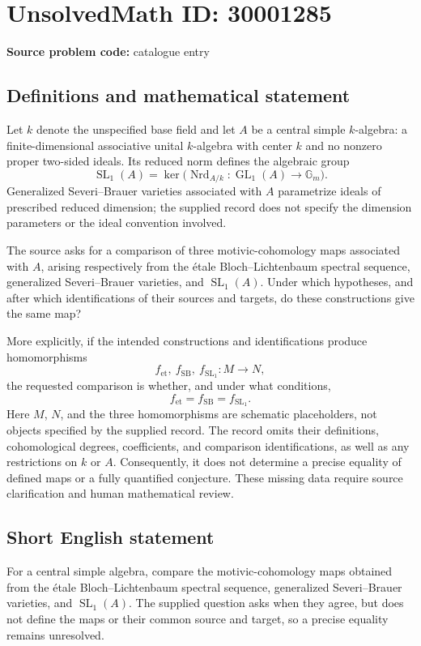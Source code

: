 \documentclass[11pt]{article}
\begin{document}
\section*{UnsolvedMath ID: 30001285}
\textbf{Source problem code:} catalogue entry
\subsection{Definitions and mathematical statement}
Let \(k\) denote the unspecified base field and let \(A\) be a central simple \(k\)-algebra: a finite-dimensional associative unital \(k\)-algebra with center \(k\) and no nonzero proper two-sided ideals. Its reduced norm defines the algebraic group
\[
\operatorname{SL}_1(A)=\ker\bigl(\operatorname{Nrd}_{A/k}:\operatorname{GL}_1(A)\longrightarrow\mathbb G_m\bigr).
\]
Generalized Severi--Brauer varieties associated with \(A\) parametrize ideals of prescribed reduced dimension; the supplied record does not specify the dimension parameters or the ideal convention involved.

The source asks for a comparison of three motivic-cohomology maps associated with \(A\), arising respectively from the \'{e}tale Bloch--Lichtenbaum spectral sequence, generalized Severi--Brauer varieties, and \(\operatorname{SL}_1(A)\). Under which hypotheses, and after which identifications of their sources and targets, do these constructions give the same map?

More explicitly, if the intended constructions and identifications produce homomorphisms
\[
f_{\mathrm{et}},\ f_{\mathrm{SB}},\ f_{\mathrm{SL}_1}:M\longrightarrow N,
\]
the requested comparison is whether, and under what conditions,
\[
f_{\mathrm{et}}=f_{\mathrm{SB}}=f_{\mathrm{SL}_1}.
\]
Here \(M\), \(N\), and the three homomorphisms are schematic placeholders, not objects specified by the supplied record. The record omits their definitions, cohomological degrees, coefficients, and comparison identifications, as well as any restrictions on \(k\) or \(A\). Consequently, it does not determine a precise equality of defined maps or a fully quantified conjecture. These missing data require source clarification and human mathematical review.
\subsection{Short English statement}
For a central simple algebra, compare the motivic-cohomology maps obtained from the \'{e}tale Bloch--Lichtenbaum spectral sequence, generalized Severi--Brauer varieties, and \(\operatorname{SL}_1(A)\). The supplied question asks when they agree, but does not define the maps or their common source and target, so a precise equality remains unresolved.
\end{document}
